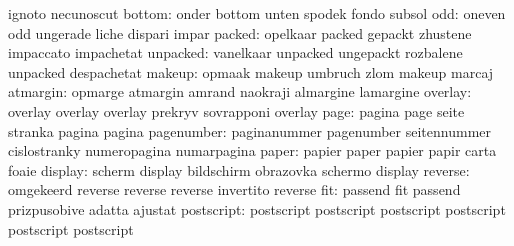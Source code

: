                            ignoto                    necunoscut
                   bottom: onder                     bottom
                           unten                     spodek
                           fondo                     subsol
                      odd: oneven                    odd
                           ungerade                  liche
                           dispari                   impar
                   packed: opelkaar                  packed
                           gepackt                   zhustene
                           impaccato                 impachetat
                 unpacked: vanelkaar                 unpacked
                           ungepackt                 rozbalene
                           unpacked                  despachetat
                   makeup: opmaak                    makeup
                           umbruch                   zlom
                           makeup                    marcaj
                 atmargin: opmarge                   atmargin
                           amrand                    naokraji
                           almargine                 lamargine
                  overlay: overlay                   overlay
                           overlay                   prekryv
                           sovrapponi                overlay
                     page: pagina                    page
                           seite                     stranka
                           pagina                    pagina
               pagenumber: paginanummer              pagenumber
                           seitennummer              cislostranky
                           numeropagina              numarpagina
                    paper: papier                    paper
                           papier                    papir
                           carta                     foaie
                  display: scherm                    display
                           bildschirm                obrazovka
                           schermo                   display %
                  reverse: omgekeerd                 reverse
                           reverse                   reverse
                           invertito                 reverse %
                      fit: passend                   fit
                           passend                   prizpusobive
                           adatta                    ajustat
               postscript: postscript                postscript
                           postscript                postscript
                           postscript                postscript
